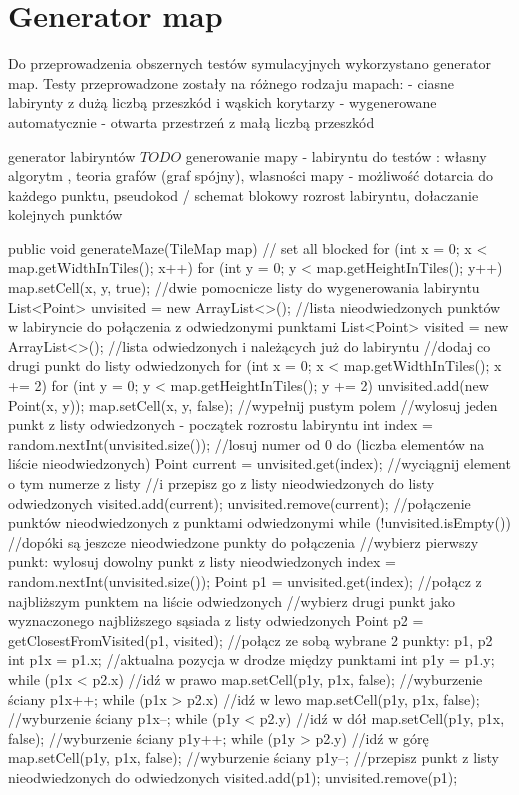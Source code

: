 \section{Generator map}

Do przeprowadzenia obszernych testów symulacyjnych wykorzystano generator map. 
Testy przeprowadzone zostały na różnego rodzaju mapach:
 - ciasne labirynty z dużą liczbą przeszkód i wąskich korytarzy - wygenerowane automatycznie
 - otwarta przestrzeń z małą liczbą przeszkód

generator labiryntów
$TODO$ generowanie mapy - labiryntu do testów : własny algorytm , teoria grafów (graf spójny), wlasności mapy - możliwość dotarcia do każdego punktu, pseudokod / schemat blokowy
rozrost labiryntu, dołaczanie kolejnych punktów


public void generateMaze(TileMap map) {
	// set all blocked
	for (int x = 0; x < map.getWidthInTiles(); x++) {
		for (int y = 0; y < map.getHeightInTiles(); y++) {
			map.setCell(x, y, true);
		}
	}
	//dwie pomocnicze listy do wygenerowania labiryntu
	List<Point> unvisited = new ArrayList<>(); //lista nieodwiedzonych punktów w labiryncie do połączenia z odwiedzonymi punktami
	List<Point> visited = new ArrayList<>(); //lista odwiedzonych i należących już do labiryntu
	//dodaj co drugi punkt do listy odwiedzonych
	for (int x = 0; x < map.getWidthInTiles(); x += 2) {
		for (int y = 0; y < map.getHeightInTiles(); y += 2) {
			unvisited.add(new Point(x, y));
			map.setCell(x, y, false); //wypełnij pustym polem
		}
	}
	//wylosuj jeden punkt z listy odwiedzonych - początek rozrostu labiryntu
	int index = random.nextInt(unvisited.size()); //losuj numer od 0 do (liczba elementów na liście nieodwiedzonych)
	Point current = unvisited.get(index); //wyciągnij element o tym numerze z listy
	//i przepisz go z listy nieodwiedzonych do listy odwiedzonych
	visited.add(current);
	unvisited.remove(current);
	//połączenie punktów nieodwiedzonych z punktami odwiedzonymi
	while (!unvisited.isEmpty()) { //dopóki są jeszcze nieodwiedzone punkty do połączenia
		//wybierz pierwszy punkt: wylosuj dowolny punkt z listy nieodwiedzonych
		index = random.nextInt(unvisited.size());
		Point p1 = unvisited.get(index);
		//połącz z najbliższym punktem na liście odwiedzonych
		//wybierz drugi punkt jako wyznaczonego najbliższego sąsiada z listy odwiedzonych
		Point p2 = getClosestFromVisited(p1, visited);
		//połącz ze sobą wybrane 2 punkty: p1, p2
		int p1x = p1.x; //aktualna pozycja w drodze między punktami
		int p1y = p1.y;
		while (p1x < p2.x) { //idź w prawo
			map.setCell(p1y, p1x, false); //wyburzenie ściany
			p1x++;
		}
		while (p1x > p2.x) { //idź w lewo
			map.setCell(p1y, p1x, false); //wyburzenie ściany
			p1x--;
		}
		while (p1y < p2.y) { //idź w dół
			map.setCell(p1y, p1x, false); //wyburzenie ściany
			p1y++;
		}
		while (p1y > p2.y) { //idź w górę
			map.setCell(p1y, p1x, false); //wyburzenie ściany
			p1y--;
		}
		//przepisz punkt z listy nieodwiedzonych do odwiedzonych
		visited.add(p1);
		unvisited.remove(p1);
	}
}

